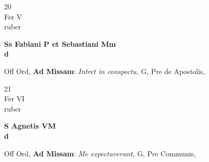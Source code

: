 \documentclass[10pt, openany]{book}
\begin{document}
        \begin{center}
            \begin{minipage}{3.5in}
                \vspace{2em}
                \begin{minipage}{0.5in}
                    {\Huge 20} \\
                    {\normalsize Fer V} \\
                    {\normalsize ruber}
                \end{minipage}
                \begin{minipage}{3.0in}
                    \textbf{ \large Ss Fabiani P et Sebastiani Mm \\
                    \textnormal{\normalsize d}} \\ 
                \end{minipage}
                \begin{justify}Off Ord, \textbf{Ad Missam}: \textit{Intret in conspectu,} G, Pre de Apostolis,  
                \end{justify}
            \end{minipage}
        \end{center}
    
        \begin{center}
            \begin{minipage}{3.5in}
                \vspace{2em}
                \begin{minipage}{0.5in}
                    {\Huge 21} \\
                    {\normalsize Fer VI} \\
                    {\normalsize ruber}
                \end{minipage}
                \begin{minipage}{3.0in}
                    \textbf{ \large S Agnetis VM \\
                    \textnormal{\normalsize d}} \\ 
                \end{minipage}
                \begin{justify}Off Ord, \textbf{Ad Missam}: \textit{Me expectaverunt,} G, Pre Communis,  
                \end{justify}
            \end{minipage}
        \end{center}
    
\end{document}

